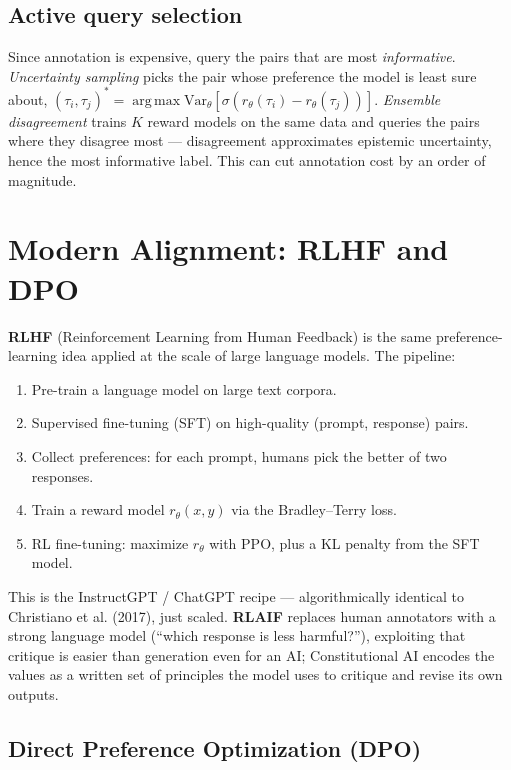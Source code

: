 \documentclass[11pt, oneside]{book}
\newcommand{\Var}{\mathrm{Var}}
\newcommand{\argmax}{\operatorname*{arg\,max}}
\begin{document}
\subsection{Active query selection}

Since annotation is expensive, query the pairs that are most \emph{informative}.
\emph{Uncertainty sampling} picks the pair whose preference the model is least sure about,
$(\tau_i,\tau_j)^* = \argmax \Var_\theta[\sigma(r_\theta(\tau_i) - r_\theta(\tau_j))]$.
\emph{Ensemble disagreement} trains $K$ reward models on the same data and queries the
pairs where they disagree most --- disagreement approximates epistemic uncertainty, hence
the most informative label. This can cut annotation cost by an order of magnitude.

\section{Modern Alignment: RLHF and DPO}

\textbf{RLHF} (Reinforcement Learning from Human Feedback) is the same preference-learning
idea applied at the scale of large language models. The pipeline:
\begin{enumerate}
  \item Pre-train a language model on large text corpora.
  \item Supervised fine-tuning (SFT) on high-quality (prompt, response) pairs.
  \item Collect preferences: for each prompt, humans pick the better of two responses.
  \item Train a reward model $r_\theta(x,y)$ via the Bradley--Terry loss.
  \item RL fine-tuning: maximize $r_\theta$ with PPO, plus a KL penalty from the SFT model.
\end{enumerate}
This is the InstructGPT / ChatGPT recipe --- algorithmically identical to Christiano et al.
(2017), just scaled. \textbf{RLAIF} replaces human annotators with a strong language model
(``which response is less harmful?''), exploiting that critique is easier than generation
even for an AI; Constitutional AI encodes the values as a written set of principles the
model uses to critique and revise its own outputs.

\subsection{Direct Preference Optimization (DPO)}
\end{document}
